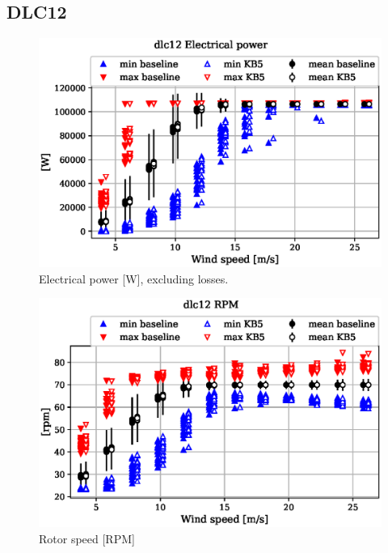 
\subsection{DLC12}
\label{sec:baseline-vs-KB6:dlc12}

\begin{figure}[!ht]
\begin{center}
	\includegraphics[width=.85\linewidth]{figures/baseline-vs-KB6/dlc12/DLL-generator_servo-inpvec-2_AA0008_AA0008.eps}
\end{center}
\caption{Electrical power [W], excluding losses.}
\label{fig:baseline-vs-KB6:dlc12:power}
\end{figure}

\begin{figure}[!ht]
\begin{center}
	\includegraphics[width=.85\linewidth]{figures/baseline-vs-KB6/dlc12/bearing-shaft_rot-angle_speed-rpm_AA0008_AA0008.eps}
\end{center}
\caption{Rotor speed [RPM]}
\label{fig:baseline-vs-KB6:dlc12:rpm}
\end{figure}

